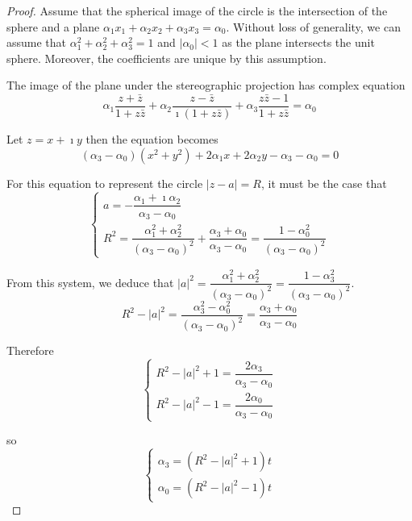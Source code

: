 \begin{proof}
	Assume that the spherical image of the circle is the intersection of the sphere and a plane \( \alpha_{1}x_{1} + \alpha_{2}x_{2} + \alpha_{3}x_{3} = \alpha_{0} \). Without loss of generality, we can assume that \( \alpha_{1}^{2} + \alpha_{2}^{2} + \alpha_{3}^{2} = 1 \) and \( \left\vert \alpha_{0} \right\vert < 1 \) as the plane intersects the unit sphere. Moreover, the coefficients are unique by this assumption.

	The image of the plane under the stereographic projection has complex equation
	\[
		\alpha_{1}\dfrac{z + \bar{z}}{1 + z\bar{z}} + \alpha_{2}\dfrac{z - \bar{z}}{\imath(1 + z\bar{z})} + \alpha_{3}\dfrac{z\bar{z} - 1}{1 + z\bar{z}} = \alpha_{0}
	\]

	Let \( z = x + \imath y \) then the equation becomes
	\[
		(\alpha_{3} - \alpha_{0})(x^{2} + y^{2}) + 2\alpha_{1}x + 2\alpha_{2}y - \alpha_{3} - \alpha_{0} = 0
	\]

	For this equation to represent the circle \( \left\vert z - a \right\vert = R \), it must be the case that
	\[
		\begin{cases}
			a = -\dfrac{\alpha_{1} + \imath \alpha_{2}}{\alpha_{3} - \alpha_{0}} \\
			R^{2} = \dfrac{\alpha_{1}^{2} + \alpha_{2}^{2}}{{(\alpha_{3} - \alpha_{0})}^{2}} + \dfrac{\alpha_{3} + \alpha_{0}}{\alpha_{3} - \alpha_{0}} = \dfrac{1 - \alpha_{0}^{2}}{{(\alpha_{3} - \alpha_{0})}^{2}}
		\end{cases}
	\]

	From this system, we deduce that \( {\left\vert a \right\vert}^{2} = \dfrac{\alpha_{1}^{2} + \alpha_{2}^{2}}{{(\alpha_{3} - \alpha_{0})}^{2}} = \dfrac{1 - \alpha_{3}^{2}}{{(\alpha_{3} - \alpha_{0})}^{2}} \).
	\[
		R^{2} - {\left\vert a \right\vert}^{2} = \dfrac{\alpha_{3}^{2} - \alpha_{0}^{2}}{{(\alpha_{3} - \alpha_{0})}^{2}} = \dfrac{\alpha_{3} + \alpha_{0}}{\alpha_{3} - \alpha_{0}}
	\]

	Therefore
	\[
		\begin{cases}
			R^{2} - {\left\vert a \right\vert}^{2} + 1 = \dfrac{2\alpha_{3}}{\alpha_{3} - \alpha_{0}} \\
			R^{2} - {\left\vert a \right\vert}^{2} - 1 = \dfrac{2\alpha_{0}}{\alpha_{3} - \alpha_{0}}
		\end{cases}
	\]

	so
	\[
		\begin{cases}
			\alpha_{3} = (R^{2} - {\left\vert a \right\vert}^{2} + 1)t \\
			\alpha_{0} = (R^{2} - {\left\vert a \right\vert}^{2} - 1)t
		\end{cases}
	\]


\end{proof}

